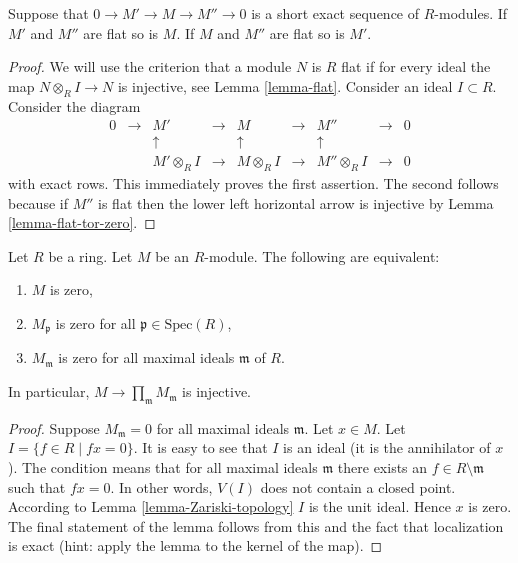 \begin{lemma}
\label{lemma-flat-ses}
Suppose that $0 \to M' \to M \to M''\to 0$ is
a short exact sequence of $R$-modules.
If $M'$ and $M''$ are flat so is $M$.
If $M$ and $M''$ are flat so is $M'$.
\end{lemma}

\begin{proof}
We will use the criterion that a module $N$ is $R$ flat if for
every ideal the map $N\otimes_RI \to N$ is injective,
see Lemma \ref{lemma-flat}.
Consider an ideal $I \subset R$.
Consider the diagram
$$
\begin{matrix}
0
&
\to 
&
M'
&
\to
&
M
&
\to
&
M''
&
\to
&
0
\\
&
&
\uparrow
&
&
\uparrow
&
&
\uparrow
&
&
\\
& 
&
M'\otimes_R I
&
\to
&
M\otimes_R I
&
\to
&
M''\otimes_R I
&
\to
&
0
\end{matrix}
$$
with exact rows. This immediately proves the first assertion.
The second follows because if $M''$ is flat then the lower left
horizontal arrow is injective by Lemma \ref{lemma-flat-tor-zero}.
\end{proof}

\begin{lemma}
\label{lemma-characterize-zero-local}
Let $R$ be a ring.
Let $M$ be an $R$-module. The following are equivalent:
\begin{enumerate}
\item $M$ is zero,
\item $M_{\mathfrak p}$ is zero for all $\mathfrak p \in \text{Spec}(R)$,
\item $M_{\mathfrak m}$ is zero for all maximal ideals $\mathfrak m$ of $R$.
\end{enumerate}
In particular, $M \to \prod_{\mathfrak m} M_{\mathfrak m}$ is injective.
\end{lemma}

\begin{proof}
Suppose $M_{\mathfrak m} = 0$ for all maximal ideals $\mathfrak m$.
Let $x \in M$. Let $I = \{f \in R \mid fx = 0\}$.
It is easy to see that $I$ is an ideal (it is the
annihilator of $x$). The condition means that for
all maximal ideals $\mathfrak m$ there exists an
$f \in R \setminus \mathfrak m$ such that $fx =0$.
In other words, $V(I)$ does not contain a closed point.
According to Lemma \ref{lemma-Zariski-topology} $I$ is the unit ideal.
Hence $x$ is zero. The final statement of the lemma follows
from this and the fact that localization is exact (hint: apply the
lemma to the kernel of the map).
\end{proof}

